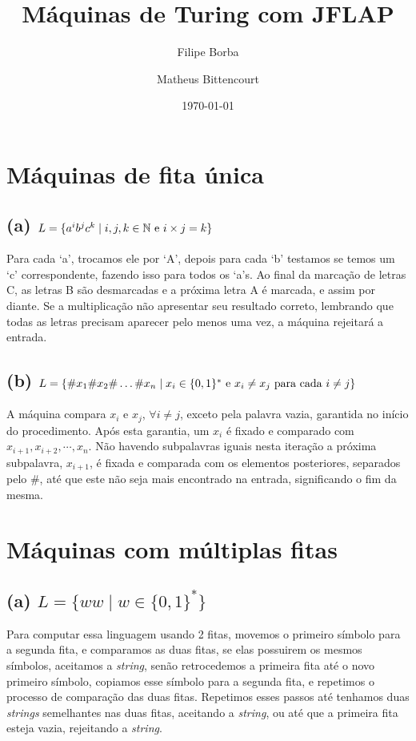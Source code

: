 \documentclass[12pt]{article}
\title{Máquinas de Turing com JFLAP}
\date{\today}
\author{Filipe Borba \and Matheus Bittencourt}
\begin{document}
\maketitle

\section{Máquinas de fita única}

\subsection*{(a) \(L = \{a^i b^j c^k \mid i,j,k \in \mathbb{N} \text{\rm{ e }}
	i \times j = k\}\)}

Para cada `a', trocamos ele por `A', depois para cada `b' testamos se temos um
`c' correspondente, fazendo isso para todos os `a's. Ao final da marcação de
letras C, as letras B são desmarcadas e a próxima letra A é marcada, e assim
por diante. Se a multiplicação não apresentar seu resultado correto, lembrando
que todas as letras precisam aparecer pelo menos uma vez, a máquina rejeitará a
entrada.

\subsection*{(b) \(L = \{\#x_1\#x_2\#\ldots\#x_n \mid x_i \in \{0,1\}^*
	\text{\rm{ e }} x_i \ne x_j \text{\rm{ para cada }} i \ne j\}\)}

A máquina compara $x_i$ e $x_j$, $\forall i\neq j$, exceto pela palavra vazia,
garantida no início do procedimento. Após esta garantia, um $x_i$ é fixado e
comparado com $x_{i+1}, x_{i+2}, \cdots, x_n$. Não havendo subpalavras iguais
nesta iteração a próxima subpalavra, $x_{i+1}$, é fixada e comparada com os
elementos posteriores, separados pelo \#, até que este não seja mais encontrado
na entrada, significando o fim da mesma.

\section{Máquinas com múltiplas fitas}

\subsection*{(a) \(L = \{ww \mid w \in \{0,1\}^*\}\)}

Para computar essa linguagem usando 2 fitas, movemos o primeiro símbolo para a
segunda fita, e comparamos as duas fitas, se elas possuirem os mesmos símbolos,
aceitamos a \textit{string}, senão retrocedemos a primeira fita até o novo
primeiro símbolo, copiamos esse símbolo para a segunda fita, e repetimos o
processo de comparação das duas fitas. Repetimos esses passos até tenhamos duas
\textit{strings} semelhantes nas duas fitas, aceitando a \textit{string}, ou
até que a primeira fita esteja vazia, rejeitando a \textit{string}.
\end{document}
